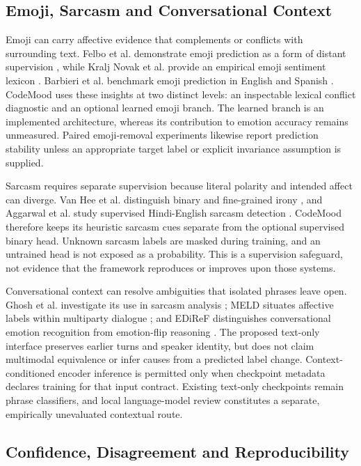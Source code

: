 \documentclass[journal]{IEEEtran}
\begin{document}
\subsection{Emoji, Sarcasm and Conversational Context}

Emoji can carry affective evidence that complements or conflicts with surrounding text. Felbo et al. demonstrate emoji prediction as a form of distant supervision \cite{felbo2017}, while Kralj Novak et al. provide an empirical emoji sentiment lexicon \cite{kraljnovak2015}. Barbieri et al. benchmark emoji prediction in English and Spanish \cite{barbieri2018}. CodeMood uses these insights at two distinct levels: an inspectable lexical conflict diagnostic and an optional learned emoji branch. The learned branch is an implemented architecture, whereas its contribution to emotion accuracy remains unmeasured. Paired emoji-removal experiments likewise report prediction stability unless an appropriate target label or explicit invariance assumption is supplied.

Sarcasm requires separate supervision because literal polarity and intended affect can diverge. Van Hee et al. distinguish binary and fine-grained irony \cite{vanhee2018}, and Aggarwal et al. study supervised Hindi-English sarcasm detection \cite{aggarwal2020}. CodeMood therefore keeps its heuristic sarcasm cues separate from the optional supervised binary head. Unknown sarcasm labels are masked during training, and an untrained head is not exposed as a probability. This is a supervision safeguard, not evidence that the framework reproduces or improves upon those systems.

Conversational context can resolve ambiguities that isolated phrases leave open. Ghosh et al. investigate its use in sarcasm analysis \cite{ghosh2018}; MELD situates affective labels within multiparty dialogue \cite{poria2019}; and EDiReF distinguishes conversational emotion recognition from emotion-flip reasoning \cite{kumar2024}. The proposed text-only interface preserves earlier turns and speaker identity, but does not claim multimodal equivalence or infer causes from a predicted label change. Context-conditioned encoder inference is permitted only when checkpoint metadata declares training for that input contract. Existing text-only checkpoints remain phrase classifiers, and local language-model review constitutes a separate, empirically unevaluated contextual route.

\subsection{Confidence, Disagreement and Reproducibility}
\end{document}
